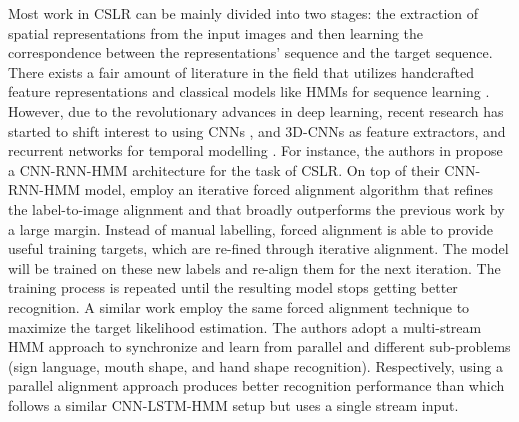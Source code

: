 \documentclass[a4paper,conference]{IEEEtran}
\begin{document}
Most work in CSLR can be mainly divided into two stages: the extraction of spatial representations from the input images and then learning the correspondence between the representations' sequence and the target sequence. There exists a fair amount of literature in the field that utilizes handcrafted feature representations \cite{monnier2014multi} and classical models like HMMs for sequence learning \cite{koller2016deep}. However, due to the revolutionary advances in deep learning, recent research has started to shift interest to using CNNs \cite{koller2016deep}, and 3D-CNNs \cite{huang2018video} as feature extractors, and recurrent networks for temporal modelling \cite{camgoz2017subunets}. For instance, the authors in \cite{koller2017re} propose a CNN-RNN-HMM architecture for the task of CSLR. On top of their CNN-RNN-HMM model, \cite{koller2017re} employ an iterative forced alignment algorithm that refines the label-to-image alignment and that broadly outperforms the previous work by a large margin. Instead of manual labelling, forced alignment is able to provide useful training targets, which are re-fined through iterative alignment. The model will be trained on these new labels and re-align them for the next iteration. The training process is repeated until the resulting model stops getting better recognition. A similar work \cite{pami2019} employ the same forced alignment technique to maximize the target likelihood estimation. The authors adopt a multi-stream HMM approach to synchronize and learn from parallel and different sub-problems (sign language, mouth shape, and hand shape recognition). Respectively, using a parallel alignment approach produces better recognition performance than \cite{koller2017re} which follows a similar CNN-LSTM-HMM setup but uses a single stream input.
\end{document}
